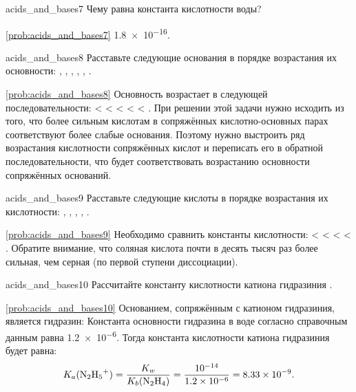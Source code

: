 \begin{problem}{}{acids_and_bases7}
    Чему равна константа кислотности воды?
    \begin{sol}{\ref{prob:acids_and_bases7}}
        \num{1,8e-16}.
    \end{sol}
\end{problem}

\begin{problem}{}{acids_and_bases8}
    Расставьте следующие основания в порядке возрастания их основности: , , , , , .
    \begin{sol}{\ref{prob:acids_and_bases8}}
        Основность возрастает в следующей последовательности:  <  <  <  <  < . При решении этой задачи нужно исходить из того, что более сильным кислотам в сопряжённых кислотно-основных парах соответствуют более слабые основания. Поэтому нужно выстроить ряд возрастания кислотности сопряжённых кислот и переписать его в обратной последовательности, что будет соответствовать возрастанию основности сопряжённых оснований.
    \end{sol}
\end{problem}

\begin{problem}{}{acids_and_bases9}
    Расставьте следующие кислоты в порядке возрастания их кислотности: , , , , .
    \begin{sol}{\ref{prob:acids_and_bases9}}
        Необходимо сравнить константы кислотности:  <  <  <  < . Обратите внимание, что соляная кислота почти в десять тысяч раз более сильная, чем серная (по первой ступени диссоциации).
    \end{sol}
\end{problem}

\begin{problem}{}{acids_and_bases10}
    Рассчитайте константу кислотности катиона гидразиния .
    \begin{sol}{\ref{prob:acids_and_bases10}}
        Основанием, сопряжённым с катионом гидразиния, является гидразин:
        Константа основности гидразина в воде согласно справочным данным равна \num{1,2e-6}. Тогда константа кислотности катиона гидразиния будет равна:
        \begin{equation*}
            K_a(\ce{N2H5^+}) = \frac{K_w}{K_b(\ce{N2H4})} = \frac{\num{e-14}}{\num{1,2e-6}} = \num{8,33e-9}.
        \end{equation*}
    \end{sol}
\end{problem}

